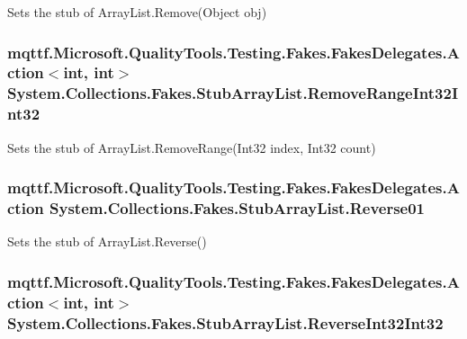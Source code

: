 Sets the stub of Array\-List.\-Remove(\-Object obj)

\hypertarget{class_system_1_1_collections_1_1_fakes_1_1_stub_array_list_a65cf71eb12bf0c7185a1b27413313444}{
\subsubsection[{Remove\-Range\-Int32\-Int32}]{\setlength{\rightskip}{0pt plus 5cm}mqttf.\-Microsoft.\-Quality\-Tools.\-Testing.\-Fakes.\-Fakes\-Delegates.\-Action$<$int, int$>$ System.\-Collections.\-Fakes.\-Stub\-Array\-List.\-Remove\-Range\-Int32\-Int32}}\label{class_system_1_1_collections_1_1_fakes_1_1_stub_array_list_a65cf71eb12bf0c7185a1b27413313444}


Sets the stub of Array\-List.\-Remove\-Range(\-Int32 index, Int32 count)

\hypertarget{class_system_1_1_collections_1_1_fakes_1_1_stub_array_list_add09ad49398ffcd153a67aad9708e7b5}{
\subsubsection[{Reverse01}]{\setlength{\rightskip}{0pt plus 5cm}mqttf.\-Microsoft.\-Quality\-Tools.\-Testing.\-Fakes.\-Fakes\-Delegates.\-Action System.\-Collections.\-Fakes.\-Stub\-Array\-List.\-Reverse01}}\label{class_system_1_1_collections_1_1_fakes_1_1_stub_array_list_add09ad49398ffcd153a67aad9708e7b5}


Sets the stub of Array\-List.\-Reverse()

\hypertarget{class_system_1_1_collections_1_1_fakes_1_1_stub_array_list_a96c338bafe89f85b3406b7d7c64b72df}{
\subsubsection[{Reverse\-Int32\-Int32}]{\setlength{\rightskip}{0pt plus 5cm}mqttf.\-Microsoft.\-Quality\-Tools.\-Testing.\-Fakes.\-Fakes\-Delegates.\-Action$<$int, int$>$ System.\-Collections.\-Fakes.\-Stub\-Array\-List.\-Reverse\-Int32\-Int32}}\label{class_system_1_1_collections_1_1_fakes_1_1_stub_array_list_a96c338bafe89f85b3406b7d7c64b72df}


